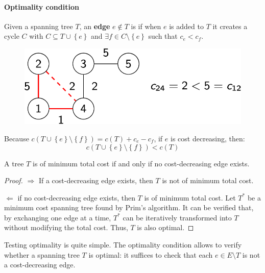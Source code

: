 \paragraph{Optimality condition}

Given a spanning tree $T$, an \textbf{edge} $e \notin T$ is  if when $e$ is added to $T$ it creates a cycle $C$ with $C \subseteq T \cup \left\{e\right\}$ and $\exists f \in C \setminus \left\{e\right\}$ such that $c_{e} < c_{f}$.
\begin{figure}[!htp]
    \centering
    \includegraphics[width=.5\textwidth]{img/trees-opt-condition.pdf}
\end{figure}

\noindent
Because $c\left(T \cup \left\{e\right\} \setminus \left\{f\right\}\right) = c\left(T\right) + c_{e} - c_{f}$, if $e$ is cost decreasing, then:
\begin{equation*}
    c\left(T \cup \left\{e\right\} \setminus \left\{f\right\}\right) < c\left(T\right)
\end{equation*}
\begin{theorem}
    A tree $T$ is of minimum total cost if and only if no cost-decreasing edge exists.
\end{theorem}
\begin{proof}
    $\Rightarrow$ If a cost-decreasing edge exists, then $T$ is not of minimum total cost.

    $\Leftarrow$ if no cost-decreasing edge exists, then $T$ is of minimum total cost. Let $T^{*}$ be a minimum cost spanning tree found by Prim's algorithm. It can be verified that, by exchanging one edge at a time, $T^{*}$ can be iteratively transformed into $T$ without modifying the total cost. Thus, $T$ is also optimal.
\end{proof}

\noindent
Testing optimality is quite simple. The optimality condition allows to verify whether a spanning tree $T$ is optimal: it suffices to check that each $e \in E \setminus T$ is not a cost-decreasing edge.